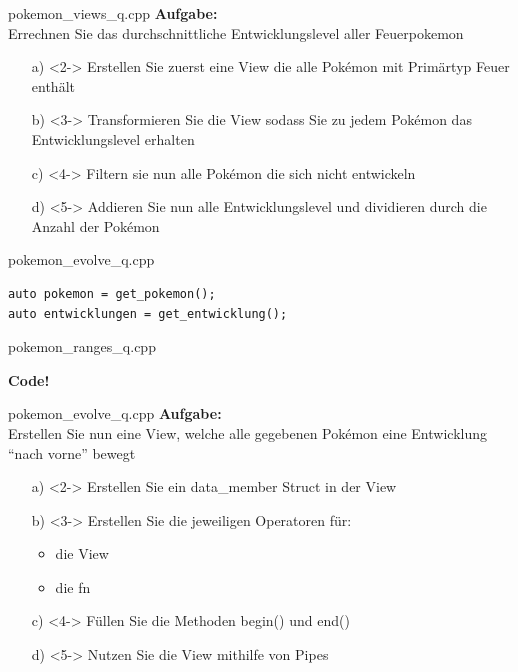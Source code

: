 \begin{frame}{pokemon\_views\_q.cpp}
    \textbf{Aufgabe:}\\
    Errechnen Sie das durchschnittliche Entwicklungslevel aller Feuerpokemon

    \vspace{1.5em}

    \begin{enumerate} %
        \item[a)]<2-> Erstellen Sie zuerst eine View die alle Pokémon mit Primärtyp Feuer enthält
        \item[b)]<3-> Transformieren Sie die View sodass Sie zu jedem Pokémon das Entwicklungslevel erhalten
        \item[c)]<4-> Filtern sie nun alle Pokémon die sich nicht entwickeln
        \item[d)]<5-> Addieren Sie nun alle Entwicklungslevel und dividieren durch die Anzahl der Pokémon
    \end{enumerate}
\end{frame}

\begin{frame}[fragile]{pokemon\_evolve\_q.cpp}
    \begin{verbatim}
auto pokemon = get_pokemon();
auto entwicklungen = get_entwicklung();
    \end{verbatim}
\end{frame}

\begin{frame}{pokemon\_ranges\_q.cpp}
    \begin{center}
        \textbf{Code!}
    \end{center}
\end{frame}

\begin{frame}{pokemon\_evolve\_q.cpp}
    \textbf{Aufgabe:}\\
    Erstellen Sie nun eine View, welche alle gegebenen Pokémon eine Entwicklung \enquote{nach vorne} bewegt

    \vspace{1.5em}

    \begin{enumerate} %
        \item[a)]<2-> Erstellen Sie ein data\_member Struct in der View
        \item[b)]<3-> Erstellen Sie die jeweiligen Operatoren für:

        \begin{itemize}
            \item die View
            \item die fn
        \end{itemize}
        \item[c)]<4-> Füllen Sie die Methoden begin() und end()
        \item[d)]<5-> Nutzen Sie die View mithilfe von Pipes
    \end{enumerate}
\end{frame}

